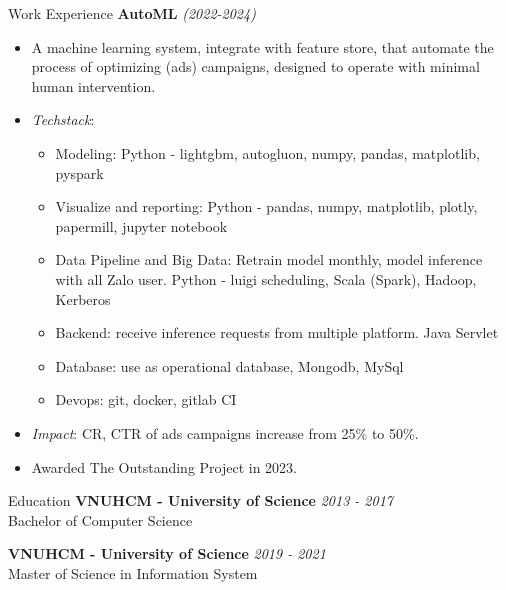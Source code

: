 \documentclass{resume} %
\begin{document}
\begin{rSection}{Work Experience}
\textbf{AutoML} \textit{(2022-2024)}
\begin{itemize}
    \item A machine learning system, integrate with feature store, that automate the process of optimizing (ads) campaigns, designed to operate with minimal human intervention.
    \item \textit{Techstack}:
    \begin{itemize}
        \item Modeling: Python - lightgbm, autogluon, numpy, pandas, matplotlib, pyspark
        \item Visualize and reporting: Python - pandas, numpy, matplotlib, plotly, papermill, jupyter notebook
        \item Data Pipeline and Big Data: Retrain model monthly,  model inference with all Zalo user. Python - luigi scheduling, Scala (Spark), Hadoop, Kerberos
        \item Backend: receive inference requests from multiple platform. Java Servlet
        \item Database: use as operational database, Mongodb, MySql
        \item Devops: git, docker, gitlab CI
    \end{itemize} 
    \item \textit{Impact}: CR, CTR of ads campaigns increase from 25\% to 50\%. 
    \item Awarded The Outstanding Project in 2023.
\end{itemize}


\begin{rSection}{Education}
{\bf VNUHCM - University of Science} \hfill {\em 2013 - 2017 } 
\\ Bachelor of Computer Science %

{\bf VNUHCM - University of Science} \hfill {\em 2019 - 2021 } 
\\ Master of Science in Information System %


\end{rSection}


\end{rSection}
\end{document}
